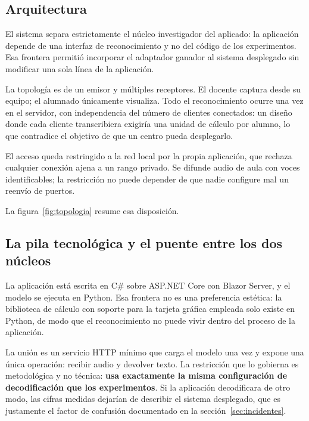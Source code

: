 \subsection{Arquitectura}
\label{sec:arquitectura-app}

El sistema separa estrictamente el núcleo investigador del aplicado: la aplicación depende
de una interfaz de reconocimiento y no del código de los experimentos. Esa frontera permitió
incorporar el adaptador ganador al sistema desplegado sin modificar una sola línea de la
aplicación.

La topología es de un emisor y múltiples receptores. El docente captura desde su equipo;
el alumnado únicamente visualiza. Todo el reconocimiento ocurre una vez en el servidor,
con independencia del número de clientes conectados: un diseño donde cada cliente
transcribiera exigiría una unidad de cálculo por alumno, lo que contradice el objetivo de
que un centro pueda desplegarlo.

El acceso queda restringido a la red local por la propia aplicación, que rechaza cualquier
conexión ajena a un rango privado. Se difunde audio de aula con voces identificables; la
restricción no puede depender de que nadie configure mal un reenvío de puertos.

La figura~\ref{fig:topologia} resume esa disposición.



\subsection{La pila tecnológica y el puente entre los dos núcleos}

La aplicación está escrita en C\# sobre ASP.NET Core con Blazor Server, y el modelo se
ejecuta en Python. Esa frontera no es una preferencia estética: la biblioteca de cálculo con
soporte para la tarjeta gráfica empleada solo existe en Python, de modo que el
reconocimiento no puede vivir dentro del proceso de la aplicación.

La unión es un servicio HTTP mínimo que carga el modelo una vez y expone una única
operación: recibir audio y devolver texto. La restricción que lo gobierna es metodológica y
no técnica: \textbf{usa exactamente la misma configuración de decodificación que los
experimentos}. Si la aplicación decodificara de otro modo, las cifras medidas dejarían de
describir el sistema desplegado, que es justamente el factor de confusión documentado en la
sección~\ref{sec:incidentes}.

